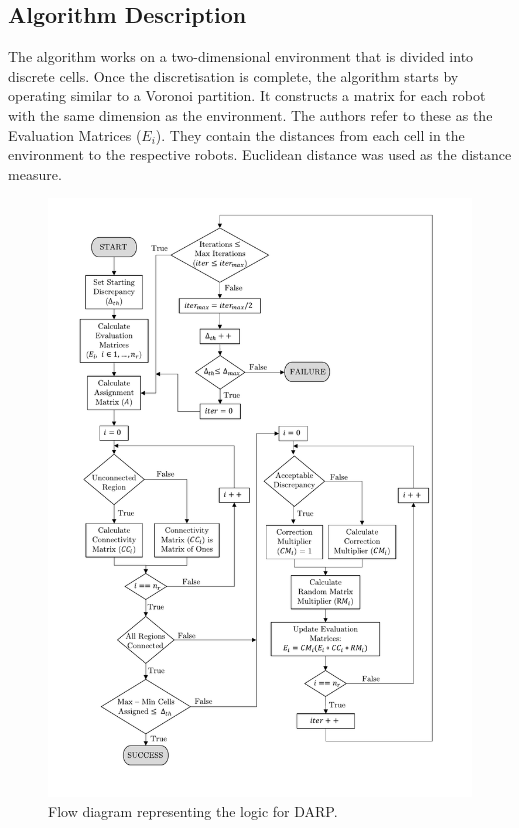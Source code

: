 \subsection{Algorithm Description}
The algorithm works on a two-dimensional environment that is divided into discrete cells. Once the discretisation is complete, the algorithm starts by operating similar to a Voronoi partition. It constructs a matrix for each robot with the same dimension as the environment. The authors refer to these as the Evaluation Matrices ($E_i$). They contain the distances from each cell in the environment to the respective robots. Euclidean distance was used as the distance measure.
\begin{figure}[h!]
\centering
\includegraphics[scale=0.8,trim={1.5cm 0 1.5cm 0},clip]{figs/DARP_Diagram3.pdf}
\caption{Flow diagram representing the logic for DARP.}
\label{fig:DARP}
\end{figure}
